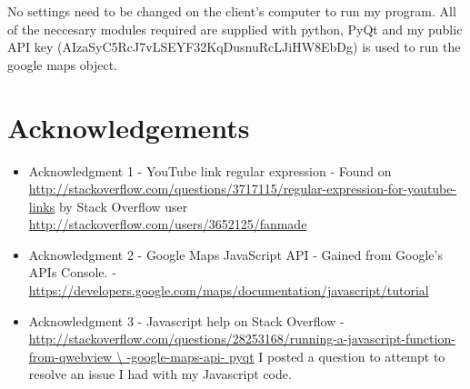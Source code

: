 No settings need to be changed on the client's computer to run my program. All of the neccesary modules required are supplied with python, PyQt and my public API key (AIzaSyC5RcJ7vLSEYF32KqDusnuRcLJiHW8EbDg)  is used to run the google maps object.





\section{Acknowledgements}

\begin{itemize}
\item Acknowledgment 1 - YouTube link regular expression - Found on \url{http://stackoverflow.com/questions/3717115/regular-expression-for-youtube-links} by Stack Overflow user \url{http://stackoverflow.com/users/3652125/fanmade}
\item Acknowledgment 2 - Google Maps JavaScript API - Gained from Google's APIs Console. - \url{https://developers.google.com/maps/documentation/javascript/tutorial}
\item Acknowledgment 3 - Javascript help on Stack Overflow -  \url{http://stackoverflow.com/questions/28253168/running-a-javascript-function-from-qwebview \ -google-maps-api- pyqt} I posted a question to attempt to resolve an issue I had with my Javascript code.
\end{itemize}

